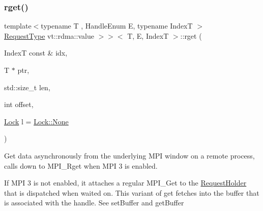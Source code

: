\subsubsection{\texorpdfstring{rget()}{rget()}\hspace{0.1cm}{\footnotesize\ttfamily [1/2]}}
{\footnotesize\ttfamily template$<$typename T , Handle\+Enum E, typename IndexT $>$ \\
\hyperlink{structvt_1_1rdma_1_1_base_typed_handle_a449c2c1948f5793c3fdfb1aba5801ed7}{Request\+Type} vt\+::rdma\+::value $>$$>$$<$ T, E, IndexT $>$\+::rget (\begin{DoxyParamCaption}\item[{IndexT const \&}]{idx,  }\item[{T $\ast$}]{ptr,  }\item[{std\+::size\+\_\+t}]{len,  }\item[{int}]{offset,  }\item[{\hyperlink{namespacevt_1_1rdma_ac5c20b41a653e520b6305d4d454ecb70}{Lock}}]{l = {\ttfamily \hyperlink{namespacevt_1_1rdma_ac5c20b41a653e520b6305d4d454ecb70a6adf97f83acf6453d4a6a4b1070f3754}{Lock\+::\+None}} }\end{DoxyParamCaption})}



Get data asynchronously from the underlying M\+PI window on a remote process, calls down to {\ttfamily M\+P\+I\+\_\+\+Rget} when M\+PI 3 is enabled. 

If M\+PI 3 is not enabled, it attaches a regular {\ttfamily M\+P\+I\+\_\+\+Get} to the {\ttfamily \hyperlink{structvt_1_1rdma_1_1_request_holder}{Request\+Holder}} that is dispatched when waited on. This variant of {\ttfamily get} fetches into the buffer that is associated with the handle. See {\ttfamily set\+Buffer} and {\ttfamily get\+Buffer} 


